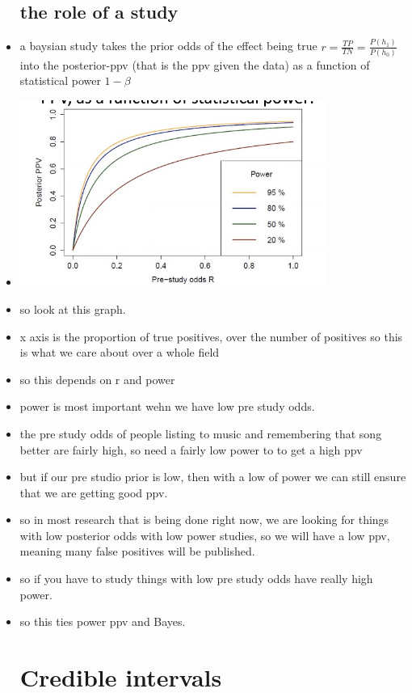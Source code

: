 \documentclass{article}
\begin{document}
\begin{itemize}
\subsection{the role of a study}
\item a baysian study takes the prior odds of the effect being true $r=\frac{TP}{TN}=\frac{P(h_1)}{P(h_0)}$ into the posterior-ppv (that is the ppv given the data) as a function of statistical power $1-\beta$ 
\item  \includegraphics[width=10cm]{Final_Review/lecture_6/ppv_versus_power.jpg}
\item so look at this graph. 
\item x axis is the proportion of true positives, over the number of positives so this is what we care about over a whole field 
\item so this depends on r and power
\item power is most important wehn we have low pre study odds. 
\item the pre study odds of people listing to music and remembering that song better are fairly high, so need a fairly low power to to get a high ppv
\item but if our pre studio prior is low, then with a low of power we can still ensure that we are getting good ppv.
\item so in most research that is being done right now, we are looking for things with low posterior odds with low power studies, so we will have a low ppv, meaning many false positives will be published.
\item so if you have to study things with low pre study odds have really high power. 
\item so this ties power ppv and Bayes. 
\section{Credible intervals}

\end{itemize}
\end{document}
